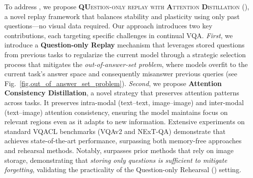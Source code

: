 To address \setting, we propose \textsc{\textbf{QU}estion-only replay with \textbf{A}ttention \textbf{D}istillation} (\textbf{\qstmethodshort{}}), a novel replay framework that balances stability and plasticity using only past questions—no visual data required. Our approach introduces two key contributions, each targeting specific challenges in continual VQA. \textit{First}, we introduce a \textbf{Question-only Replay} mechanism that leverages stored questions from previous tasks to regularize the current model through a strategic selection process that mitigates the \textit{out-of-answer-set problem}, where models overfit to the current task's answer space and consequently misanswer previous queries (see Fig.~\ref{fig.out_of_answer_set_problem}). \textit{Second}, we propose \textbf{Attention Consistency Distillation}, a novel strategy that preserves attention patterns across tasks. It preserves intra-modal (text–text, image–image) and inter-modal (text–image) attention consistency, ensuring the model maintains focus on relevant regions even as it adapts to new information. Extensive experiments on standard VQACL benchmarks (VQAv2 and NExT-QA) demonstrate that \qstmethodshort{} achieves state-of-the-art performance, surpassing both memory-free approaches and rehearsal methods. Notably, \qstmethodshort{} surpasses prior methods that rely on image storage, demonstrating that \textit{storing only questions is sufficient to mitigate forgetting}, validating the practicality of the Question-only Rehearsal (\setting) setting.